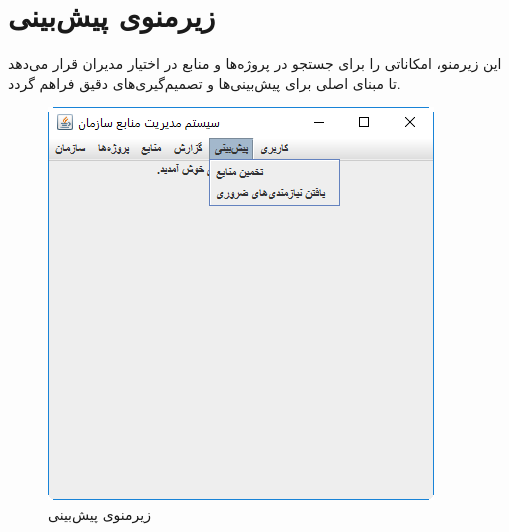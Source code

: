 \newpage
\section{زیرمنوی پیش‌بینی}
این زیرمنو، امکاناتی را برای جستجو در پروژه‌ها و منابع در اختیار مدیران قرار می‌دهد تا مبنای اصلی برای پیش‌بینی‌ها و تصمیم‌گیری‌های دقیق فراهم گردد.
	\begin{figure}[H]
		\centering
		\includegraphics[scale=0.7]{img/manual/estSubmenu}
		\caption{زیرمنوی پیش‌بینی}
	\end{figure}

